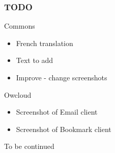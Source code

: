 \documentclass{beamer}
\begin{document}
\begin{frame}
\frametitle{TODO}

\begin{block}{Commons}
\begin{itemize}
\item French translation
\item Text to add
\item Improve - change screenshots
\end{itemize}
\end{block}

\begin{block}{Owcloud}
\begin{itemize}
\item Screenshot of Email client
 \item Screenshot of Bookmark client
\end{itemize}
\end{block}
\end{frame}

\begin{frame}
\Huge{\centerline{To be continued}}
\end{frame}
\end{document}
